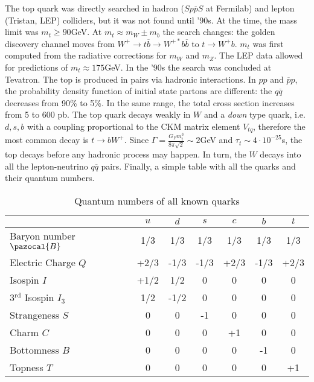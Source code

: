 \documentclass[10.75pt,a4paper,openright,bottom=2cm]{article}
\begin{document}
The top quark was directly searched in hadron ($Sp\overline{p}S$ at Fermilab) and lepton (Tristan, LEP) colliders, but it was not found until '90s. At the time, the mass limit was $m_t\ge90$\;GeV. At $m_t\approx m_W\pm m_b$ the search changes: the golden discovery channel moves from $W^+\to t\overline{b}\to W^{+*}b\overline{b}$ to $t\to W^+b$. $m_t$ was first computed from the radiative corrections for $m_W$ and $m_Z$. The LEP data allowed for predictions of $m_t\approx175$\;GeV. In the '90s the search was concluded at Tevatron. The top is produced in pairs via hadronic interactions. In $pp$ and $\overline{p}p$, the probability density function of initial state partons are different: the $q\overline{q}$ decreases from 90\% to 5\%. In the same range, the total cross section increases from 5 to 600 pb. The top quark decays weakly in $W$ and a \textit{down} type quark, i.e. $d,s,b$ with a coupling proportional to the CKM matrix element $V_{tq}$, therefore the most common decay is $t\to bW^+$. Since $\Gamma=\frac{G_F m_t^3}{8\pi\sqrt{2}}\sim2$\;GeV and $\tau_t\sim4\cdot10^{-25}$\;s, the top decays before any hadronic process may happen. In turn, the $W$ decays into all the lepton-neutrino $q\overline{q}$ pairs. Finally, a simple table with all the quarks and their quantum numbers.
\begin{table}[h]
    \centering
    \begin{tabular}{l|cccccc}
    \hline
    \cellcolor{gray!50} & \cellcolor{yellow!50}$u$ & \cellcolor{yellow!50}$d$ & \cellcolor{yellow!50}$s$ & \cellcolor{yellow!50}$c$ & \cellcolor{yellow!50}$b$ & \cellcolor{yellow!50}$t$\\
    \hline\hline
    \cellcolor{yellow!50}Baryon number $\pazocal{B}$ & 1/3 & 1/3 & 1/3 & 1/3 & 1/3 & 1/3\\
    \hline
    \cellcolor{yellow!50}Electric Charge $Q$ & +2/3 & -1/3 & -1/3 & +2/3 & -1/3 & +2/3\\
    \hline
    \cellcolor{yellow!50}Isospin $I$ & +1/2 & 1/2 & 0 & 0 & 0 & 0\\
    \hline
    \cellcolor{yellow!50}3$^{\text{rd}}$ Isospin $I_3$ & 1/2 & -1/2 & 0 & 0 & 0 & 0\\
    \hline
    \cellcolor{yellow!50}Strangeness $S$ & 0 & 0 & -1 & 0 & 0 & 0\\
    \hline
    \cellcolor{yellow!50}Charm $C$ & 0 & 0 & 0 & +1 & 0 & 0\\
    \hline
    \cellcolor{yellow!50}Bottomness $B$ & 0 & 0 & 0 & 0 & -1 & 0\\
    \hline
    \cellcolor{yellow!50}Topness $T$ & 0 & 0 & 0 & 0 & 0 & +1\\
    \hline
    \end{tabular}
    \caption{Quantum numbers of all known quarks}
    \label{tabquarks}
\end{table}
\end{document}

